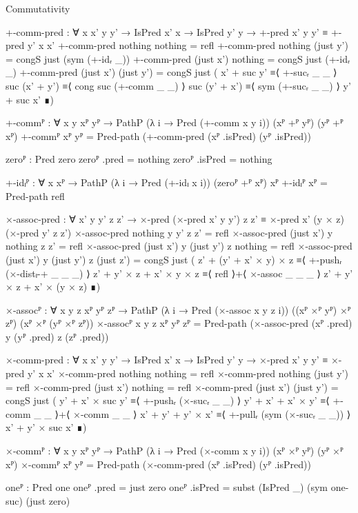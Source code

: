 Commutativity
\begin{code}
  +-comm-pred :
    ∀ {x x' y y'} → IsPred x' x → IsPred y' y →
    +-pred x' y y' ≡ +-pred y' x x'
  +-comm-pred nothing nothing = refl
  +-comm-pred nothing (just y') = congS just (sym (+-idᵣ _))
  +-comm-pred (just x') nothing = congS just (+-idᵣ _)
  +-comm-pred (just x') (just y') =
    congS just
      ( x' + suc y'   ≡⟨ +-sucᵣ _ _ ⟩
        suc (x' + y') ≡⟨ cong suc (+-comm _ _) ⟩
        suc (y' + x') ≡⟨ sym (+-sucᵣ _ _) ⟩
        y' + suc x'   ∎)
\end{code}
\begin{code}[hide]
  +-commᴾ :
    ∀ {x y} xᴾ yᴾ → PathP (λ i → Pred (+-comm x y i)) (xᴾ +ᴾ yᴾ) (yᴾ +ᴾ xᴾ)
  +-commᴾ xᴾ yᴾ = Pred-path (+-comm-pred (xᴾ .isPred) (yᴾ .isPred))

  zeroᴾ : Pred zero
  zeroᴾ .pred = nothing
  zeroᴾ .isPred = nothing

  +-idₗᴾ : ∀ {x} xᴾ → PathP (λ i → Pred (+-idₗ x i)) (zeroᴾ +ᴾ xᴾ) xᴾ
  +-idₗᴾ xᴾ = Pred-path refl

  ×-assoc-pred :
    ∀ x' y y' z z' →
    ×-pred (×-pred x' y y') z z' ≡ ×-pred x' (y × z) (×-pred y' z z')
  ×-assoc-pred nothing y y' z z' = refl
  ×-assoc-pred (just x') y nothing z z' = refl
  ×-assoc-pred (just x') y (just y') z nothing = refl
  ×-assoc-pred (just x') y (just y') z (just z') =
    congS just
      ( z' + (y' + x' × y) × z     ≡⟨ +-pushᵣ (×-distₗ-+ _ _ _) ⟩
        z' + y' × z + x' × y × z   ≡⟨ refl ⟩+⟨ ×-assoc _ _ _ ⟩
        z' + y' × z + x' × (y × z) ∎)

  ×-assocᴾ : ∀ {x y z} xᴾ yᴾ zᴾ →
    PathP (λ i → Pred (×-assoc x y z i)) ((xᴾ ×ᴾ yᴾ) ×ᴾ zᴾ) (xᴾ ×ᴾ (yᴾ ×ᴾ zᴾ))
  ×-assocᴾ {x} {y} {z} xᴾ yᴾ zᴾ =
    Pred-path (×-assoc-pred (xᴾ .pred) y (yᴾ .pred) z (zᴾ .pred))

  ×-comm-pred :
    ∀ {x x' y y'} → IsPred x' x → IsPred y' y →
    ×-pred x' y y' ≡ ×-pred y' x x'
  ×-comm-pred nothing nothing = refl
  ×-comm-pred nothing (just y') = refl
  ×-comm-pred (just x') nothing = refl
  ×-comm-pred (just x') (just y') =
    congS just
      ( y' + x' × suc y'   ≡⟨ +-pushᵣ (×-sucᵣ _ _) ⟩
        y' + x' + x' × y' ≡⟨ +-comm _ _ ⟩+⟨ ×-comm _ _ ⟩
        x' + y' + y' × x' ≡⟨ +-pullᵣ (sym (×-sucᵣ _ _)) ⟩
        x' + y' × suc x' ∎)

  ×-commᴾ :
    ∀ {x y} xᴾ yᴾ → PathP (λ i → Pred (×-comm x y i)) (xᴾ ×ᴾ yᴾ) (yᴾ ×ᴾ xᴾ)
  ×-commᴾ xᴾ yᴾ = Pred-path (×-comm-pred (xᴾ .isPred) (yᴾ .isPred))

  oneᴾ : Pred one
  oneᴾ .pred = just zero
  oneᴾ .isPred = subst (IsPred _) (sym one-suc) (just zero)


\end{code}
